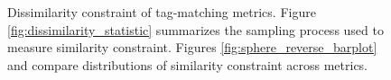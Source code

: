 \begin{figure}
\begin{center}
\caption{
Dissimilarity constraint of tag-matching metrics.
Figure \ref{fig:dissimilarity_statistic} summarizes the sampling process used to measure similarity constraint.
Figures \ref{fig:sphere_reverse_barplot} and  \label{fig:sphere_reverse_distnplot} compare distributions of similarity constraint across metrics.
}
\label{fig:sphere_reverse}

\end{center}
\end{figure}
